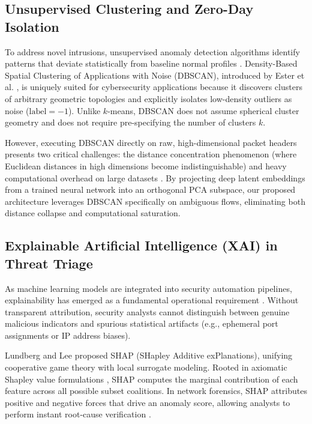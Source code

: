 \documentclass[preprint,12pt]{elsarticle}
\begin{document}
\subsection{Unsupervised Clustering and Zero-Day Isolation}
To address novel intrusions, unsupervised anomaly detection algorithms identify patterns that deviate statistically from baseline normal profiles \cite{ahmed2016survey}. Density-Based Spatial Clustering of Applications with Noise (DBSCAN), introduced by Ester et al. \cite{ester1996density}, is uniquely suited for cybersecurity applications because it discovers clusters of arbitrary geometric topologies and explicitly isolates low-density outliers as noise ($\text{label} = -1$). Unlike $k$-means, DBSCAN does not assume spherical cluster geometry and does not require pre-specifying the number of clusters $k$.

However, executing DBSCAN directly on raw, high-dimensional packet headers presents two critical challenges: the distance concentration phenomenon (where Euclidean distances in high dimensions become indistinguishable) and heavy computational overhead on large datasets \cite{aggarwal2001surprising}. By projecting deep latent embeddings from a trained neural network into an orthogonal PCA subspace, our proposed architecture leverages DBSCAN specifically on ambiguous flows, eliminating both distance collapse and computational saturation.

\subsection{Explainable Artificial Intelligence (XAI) in Threat Triage}
As machine learning models are integrated into security automation pipelines, explainability has emerged as a fundamental operational requirement \cite{arrieta2020explainable, tjoa2020survey}. Without transparent attribution, security analysts cannot distinguish between genuine malicious indicators and spurious statistical artifacts (e.g., ephemeral port assignments or IP address biases).

Lundberg and Lee \cite{lundberg2017unified} proposed SHAP (SHapley Additive exPlanations), unifying cooperative game theory with local surrogate modeling. Rooted in axiomatic Shapley value formulations \cite{shapley1953value}, SHAP computes the marginal contribution of each feature across all possible subset coalitions. In network forensics, SHAP attributes positive and negative forces that drive an anomaly score, allowing analysts to perform instant root-cause verification \cite{wang2020interpreting}.
\end{document}
